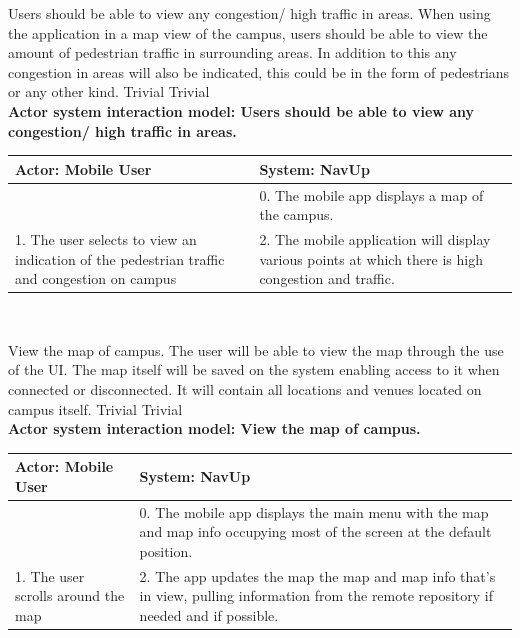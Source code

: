 \FuncReq
{Users should be able to view any congestion/ high traffic in areas.}
{When using the application in a map view of the campus, users should be able to view the amount of pedestrian traffic in surrounding areas. In addition to this any congestion in areas will also be indicated, this could be in the form of pedestrians or any other kind.}
{Trivial}
{Trivial}
\bigskip
	\\
    \textbf{Actor system interaction model: Users should be able to view any congestion/ high traffic in areas.}\\
    \begin{tabular}{ | p{6cm} | p{6cm} |}
    \hline
    Actor: Mobile User & System: NavUp \\ \hline
    & 0. The mobile app displays a map of the campus.\\ \hline
    1. The user selects to view an indication of the pedestrian traffic and congestion on campus & 2. The mobile application will display various points at which there is high congestion and traffic.\\ \hline
    \end{tabular}
\\
\bigskip

\FuncReq
{View the map of campus.}
{The user will be able to view the map through the use of the UI. The map itself will be saved on the system enabling access to it when connected or disconnected. It will contain all locations and venues located on campus itself.}
{Trivial}
{Trivial}
    \\
    \textbf{Actor system interaction model: View the map of campus. }\\
    \begin{tabular}{ | p{6cm} | p{6cm} |}
    \hline
    Actor: Mobile User & System: NavUp \\ \hline
     & 0. The mobile app displays the main menu with the map and map info occupying most of the screen at the default position.\\ \hline
    1. The user scrolls around the map & 2. The app updates the map the map and map info that's in view, pulling information from the remote repository if needed and if possible.\\ \hline
    
    \end{tabular}
\\
\bigskip

